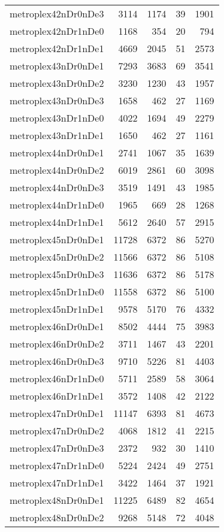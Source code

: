 \begin{longtable}{lrrrr}
metroplex42nDr0nDe3 & 3114 & 1174 & 39 & 1901 \\
metroplex42nDr1nDe0 & 1168 & 354 & 20 & 794 \\
metroplex42nDr1nDe1 & 4669 & 2045 & 51 & 2573 \\
metroplex43nDr0nDe1 & 7293 & 3683 & 69 & 3541 \\
metroplex43nDr0nDe2 & 3230 & 1230 & 43 & 1957 \\
metroplex43nDr0nDe3 & 1658 & 462 & 27 & 1169 \\
metroplex43nDr1nDe0 & 4022 & 1694 & 49 & 2279 \\
metroplex43nDr1nDe1 & 1650 & 462 & 27 & 1161 \\
metroplex44nDr0nDe1 & 2741 & 1067 & 35 & 1639 \\
metroplex44nDr0nDe2 & 6019 & 2861 & 60 & 3098 \\
metroplex44nDr0nDe3 & 3519 & 1491 & 43 & 1985 \\
metroplex44nDr1nDe0 & 1965 & 669 & 28 & 1268 \\
metroplex44nDr1nDe1 & 5612 & 2640 & 57 & 2915 \\
metroplex45nDr0nDe1 & 11728 & 6372 & 86 & 5270 \\
metroplex45nDr0nDe2 & 11566 & 6372 & 86 & 5108 \\
metroplex45nDr0nDe3 & 11636 & 6372 & 86 & 5178 \\
metroplex45nDr1nDe0 & 11558 & 6372 & 86 & 5100 \\
metroplex45nDr1nDe1 & 9578 & 5170 & 76 & 4332 \\
metroplex46nDr0nDe1 & 8502 & 4444 & 75 & 3983 \\
metroplex46nDr0nDe2 & 3711 & 1467 & 43 & 2201 \\
metroplex46nDr0nDe3 & 9710 & 5226 & 81 & 4403 \\
metroplex46nDr1nDe0 & 5711 & 2589 & 58 & 3064 \\
metroplex46nDr1nDe1 & 3572 & 1408 & 42 & 2122 \\
metroplex47nDr0nDe1 & 11147 & 6393 & 81 & 4673 \\
metroplex47nDr0nDe2 & 4068 & 1812 & 41 & 2215 \\
metroplex47nDr0nDe3 & 2372 & 932 & 30 & 1410 \\
metroplex47nDr1nDe0 & 5224 & 2424 & 49 & 2751 \\
metroplex47nDr1nDe1 & 3422 & 1464 & 37 & 1921 \\
metroplex48nDr0nDe1 & 11225 & 6489 & 82 & 4654 \\
metroplex48nDr0nDe2 & 9268 & 5148 & 72 & 4048 \\

\end{longtable}
